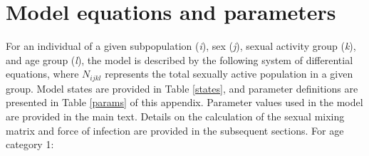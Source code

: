 \documentclass[a4paper]{article}
\begin{document}
\section{Model equations and parameters}
\label{sec:eqn}
For an individual of a given subpopulation (\textit{i}), sex (\textit{j}), sexual activity group (\textit{k}), and age group (\textit{l}), the model is described by the following system of differential equations, where $N_{ijkl}$ represents the total sexually active population in a given group. Model states are provided in Table \ref{states}, and parameter definitions are presented in Table \ref{params} of this appendix. Parameter values used in the model are provided in the main text.  Details on the calculation of the sexual mixing matrix and force of infection are provided in the subsequent sections.\newline \newline
For age category 1:
\end{document}
